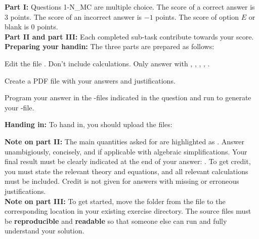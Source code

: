 \documentclass[addpoints]{exam}
\begin{document}
{\begin{center}
{{{\noindent \textbf{Part I: } Questions 1-{{N_MC}} are multiple choice. The score of a correct answer is 3 points. The score of an incorrect answer is $-1$ points. The score of option $E$ or blank is $0$ points.\\
\noindent \textbf{Part II and part III: } Each completed sub-task contribute towards your score. \\
\noindent \textbf{Preparing your handin:} The three parts are prepared as follows:
\begin{description}[noitemsep,topsep=0pt]
    \item[Part I:] Edit the file . Don't include calculations. Only answer with , , , , .
    \item[Part II:] Create a PDF file with your answers and justifications.
    \item[Part III:] Program your answer in the -files indicated in the question and run  to generate your -file.
\end{description}
\noindent \textbf{Handing in: } To hand in, you should upload the files:
\noindent \textbf{Note on part II: }
The main quantities asked for are highlighted as . Answer unambigiously, concisely, and if applicable with algebraic simplifications.
Your final result must be clearly indicated at the end of your answer: . To get credit, you must state the relevant theory and equations, and all relevant calculations must be included.
  Credit is not given for answers with missing or erroneous justifications.\\
\noindent \textbf{Note on part III:} To get started, move the folder  from the  file to the corresponding location in your existing exercise directory.
The  source files must be \textbf{reproducible} and \textbf{readable} so that someone else can run and fully understand your solution.
}}}
\end{center}}
\end{document}

